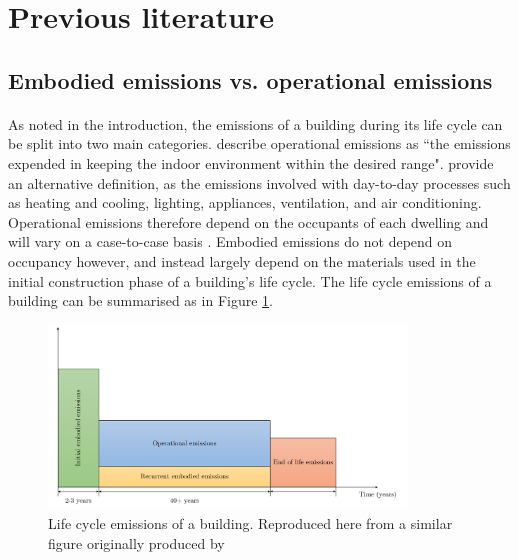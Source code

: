 \documentclass[12pt]{article}
\begin{document}

\section{Previous literature}
\label{PreviousLiterature}

\subsection{Embodied emissions vs. operational emissions}
\label{EmbodiedVsOperational}

\paragraph{}
As noted in the introduction, the emissions of a building during its life cycle can be split into two main categories. \citet{Ibn-Mohammed2013-wu} describe operational emissions as ``the emissions expended in keeping the indoor environment within the desired range". \citet{Ramesh2010-wc} provide an alternative definition, as the emissions involved with day-to-day processes such as heating and cooling, lighting, appliances, ventilation, and air conditioning. Operational emissions therefore depend on the occupants of each dwelling and will vary on a case-to-case basis \citep{Ramesh2010-wc}. Embodied emissions do not depend on occupancy however, and instead largely depend on the materials used in the initial construction phase of a building's life cycle. The life cycle emissions of a building can be summarised as in Figure \ref{fig:lifecycleemissions}.

\begin{figure}[!ht]
    \centering
    \includegraphics[width=0.85\textwidth]{Figures/LifecycleEmissions.png}
    \caption{Life cycle emissions of a building. Reproduced here from a similar figure originally produced by \citet{Ibn-Mohammed2013-wu}}
    \label{fig:lifecycleemissions}
\end{figure}
\end{document}
